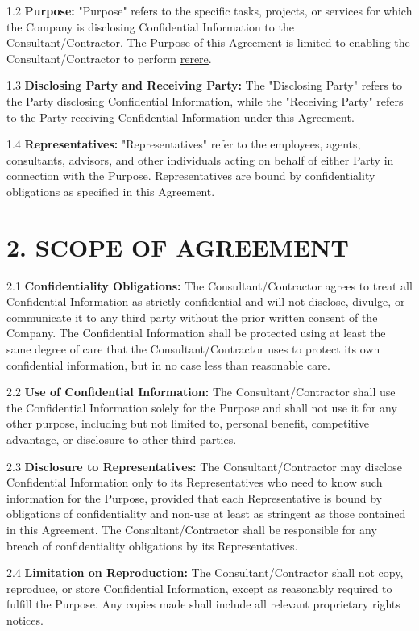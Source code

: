 \documentclass[12pt]{article}
\begin{document}
1.2 \textbf{Purpose:} "Purpose" refers to the specific tasks, projects, or services for which the Company is disclosing Confidential Information to the Consultant/Contractor. The Purpose of this Agreement is limited to enabling the Consultant/Contractor to perform \underline{rerere}.

1.3 \textbf{Disclosing Party and Receiving Party:} The "Disclosing Party" refers to the Party disclosing Confidential Information, while the "Receiving Party" refers to the Party receiving Confidential Information under this Agreement.

1.4 \textbf{Representatives:} "Representatives" refer to the employees, agents, consultants, advisors, and other individuals acting on behalf of either Party in connection with the Purpose. Representatives are bound by confidentiality obligations as specified in this Agreement.

\section*{2. SCOPE OF AGREEMENT}

2.1 \textbf{Confidentiality Obligations:} The Consultant/Contractor agrees to treat all Confidential Information as strictly confidential and will not disclose, divulge, or communicate it to any third party without the prior written consent of the Company. The Confidential Information shall be protected using at least the same degree of care that the Consultant/Contractor uses to protect its own confidential information, but in no case less than reasonable care.

2.2 \textbf{Use of Confidential Information:} The Consultant/Contractor shall use the Confidential Information solely for the Purpose and shall not use it for any other purpose, including but not limited to, personal benefit, competitive advantage, or disclosure to other third parties.

2.3 \textbf{Disclosure to Representatives:} The Consultant/Contractor may disclose Confidential Information only to its Representatives who need to know such information for the Purpose, provided that each Representative is bound by obligations of confidentiality and non-use at least as stringent as those contained in this Agreement. The Consultant/Contractor shall be responsible for any breach of confidentiality obligations by its Representatives.

2.4 \textbf{Limitation on Reproduction:} The Consultant/Contractor shall not copy, reproduce, or store Confidential Information, except as reasonably required to fulfill the Purpose. Any copies made shall include all relevant proprietary rights notices.
\end{document}

